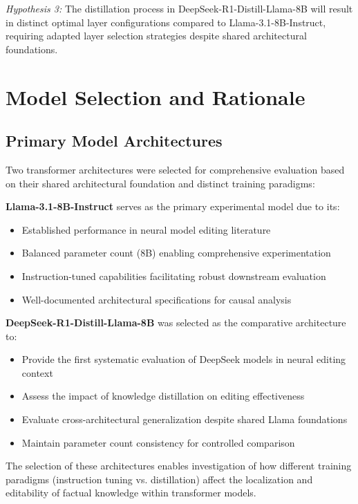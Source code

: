 \textit{Hypothesis 3:} The distillation process in DeepSeek-R1-Distill-Llama-8B will result in distinct optimal layer configurations compared to Llama-3.1-8B-Instruct, requiring adapted layer selection strategies despite shared architectural foundations.

\section{Model Selection and Rationale}

\subsection{Primary Model Architectures}

Two transformer architectures were selected for comprehensive evaluation based on their shared architectural foundation and distinct training paradigms:

\textbf{Llama-3.1-8B-Instruct} serves as the primary experimental model due to its:
\begin{itemize}
    \item Established performance in neural model editing literature
    \item Balanced parameter count (8B) enabling comprehensive experimentation
    \item Instruction-tuned capabilities facilitating robust downstream evaluation
    \item Well-documented architectural specifications for causal analysis
\end{itemize}

\textbf{DeepSeek-R1-Distill-Llama-8B} was selected as the comparative architecture to:
\begin{itemize}
    \item Provide the first systematic evaluation of DeepSeek models in neural editing context
    \item Assess the impact of knowledge distillation on editing effectiveness
    \item Evaluate cross-architectural generalization despite shared Llama foundations
    \item Maintain parameter count consistency for controlled comparison
\end{itemize}

The selection of these architectures enables investigation of how different training paradigms (instruction tuning vs. distillation) affect the localization and editability of factual knowledge within transformer models.

